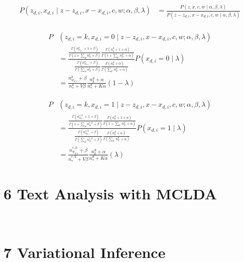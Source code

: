 \documentclass[12pt]{article}
\begin{document}
\begin{align}
P (z_{d,i}, x_{d,i} \mid z-z_{d,i},x-x_{d,i},c,w;\alpha, \beta, \lambda) &= \frac{P (z, x, c, w\mid \alpha, \beta, \lambda)}{P (z-z_{d,i}, x-x_{d,i}, c, w\mid \alpha, \beta, \lambda)} \nonumber\\
\end{align}

\begin{align}
P &(z_{d,i}=k, x_{d,i} = 0 \mid z-z_{d,i},x-x_{d,i},c,w;\alpha, \beta, \lambda)  \nonumber\\
&=\frac{\frac{\Gamma(n^{k}_{w_{d,i}} +1+\beta)}{\Gamma(1+\sum_{w} n^{k}_{w}+\beta)}  \frac{\Gamma(n^{d}_{k} +1+\alpha)}{\Gamma(1+\sum_{k'} n^{k'}_{w}+\alpha)}}{\frac{\Gamma(n^{k}_{w_{d,i}} +\beta)}{\Gamma(\sum_{w} n^{k}_{w}+\beta)}  \frac{\Gamma(n^{d}_{k} +\alpha)}{\Gamma(\sum_{k'} n^{k'}_{w}+\alpha)}} P(x_{d,i} = 0 \mid \lambda)\nonumber\\
&= \frac{n^{k}_{w_{d,i}}+\beta}{n^{k}_{*}+V\beta}  \frac{n^{d}_{k} +\alpha}{n^{d}_{*} +K\alpha} (1-\lambda) 
\end{align}

\begin{align}
P &(z_{d,i}=k, x_{d,i} = 1 \mid z-z_{d,i},x-x_{d,i},c,w;\alpha, \beta, \lambda)  \nonumber\\
&=\frac{\frac{\Gamma(n^{c,k}_{w_{d,i}} +1+\beta)}{\Gamma(1+\sum_{w} n^{c,k}_{w}+\beta)}  \frac{\Gamma(n^{d}_{k} +1+\alpha)}{\Gamma(1+\sum_{k'} n^{k'}_{w}+\alpha)}}{\frac{\Gamma(n^{c,k}_{w_{d,i}} +\beta)}{\Gamma(\sum_{w} n^{c,k}_{w}+\beta)}  \frac{\Gamma(n^{d}_{k} +\alpha)}{\Gamma(\sum_{k'} n^{k'}_{w}+\alpha)}} P(x_{d,i} = 1 \mid \lambda)\nonumber\\
&= \frac{n^{c,k}_{w_{d,i}}+\beta}{n^{c,k}_{*}+V\beta}  \frac{n^{d}_{k} +\alpha}{n^{d}_{*} +K\alpha} (\lambda) 
\end{align}


\section*{6 Text Analysis with MCLDA}
\\

\section*{7 Variational Inference}
\\



\end{document}
